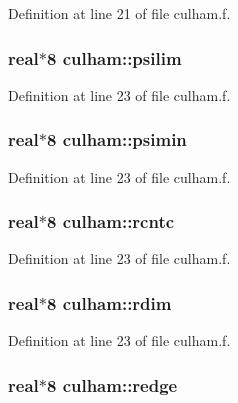 Definition at line 21 of file culham.f.\hypertarget{namespaceculham_5aa2b255c3d1667ed12833d5f1d466a7}{
\subsubsection[psilim]{\setlength{\rightskip}{0pt plus 5cm}real$\ast$8 {\bf culham::psilim}}}
\label{namespaceculham_5aa2b255c3d1667ed12833d5f1d466a7}




Definition at line 23 of file culham.f.\hypertarget{namespaceculham_d928d97ed9e2567e915c0c261b8a331e}{
\subsubsection[psimin]{\setlength{\rightskip}{0pt plus 5cm}real$\ast$8 {\bf culham::psimin}}}
\label{namespaceculham_d928d97ed9e2567e915c0c261b8a331e}




Definition at line 23 of file culham.f.\hypertarget{namespaceculham_24829ee796bd46efe1c8987c323136f4}{
\subsubsection[rcntc]{\setlength{\rightskip}{0pt plus 5cm}real$\ast$8 {\bf culham::rcntc}}}
\label{namespaceculham_24829ee796bd46efe1c8987c323136f4}




Definition at line 23 of file culham.f.\hypertarget{namespaceculham_ef180524d42fe683c14541e7315e32ef}{
\subsubsection[rdim]{\setlength{\rightskip}{0pt plus 5cm}real$\ast$8 {\bf culham::rdim}}}
\label{namespaceculham_ef180524d42fe683c14541e7315e32ef}




Definition at line 23 of file culham.f.\hypertarget{namespaceculham_a03f34fd140fa9f55078c495f874f2f9}{
\subsubsection[redge]{\setlength{\rightskip}{0pt plus 5cm}real$\ast$8 {\bf culham::redge}}}
\label{namespaceculham_a03f34fd140fa9f55078c495f874f2f9}




